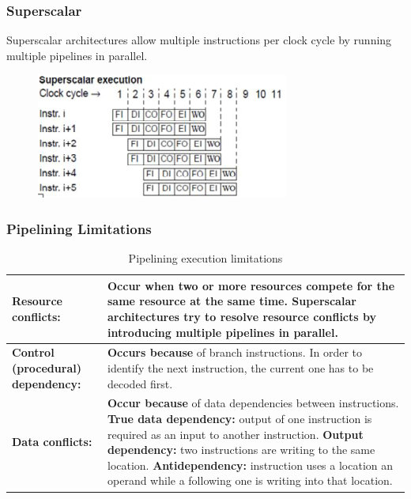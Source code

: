 		\begin{minipage}[t][7cm]{0.475\textwidth}
			\subsubsection{Superscalar}
			Superscalar architectures allow multiple instructions per clock cycle by running multiple pipelines in parallel.
			\vfill
			\begin{figure}[H]\centering
				\includegraphics[width=\textwidth]{./pictures/superscalar.png}
			\end{figure}
		\end{minipage}		
		
		
		\subsubsection{Pipelining Limitations}
			\begin{table}[H]\centering
				\begin{tabular}{|>{\bfseries}p{}|p{}|}
					\hline
					Resource conflicts:
						& \textbf{Occur when} two or more resources compete for the same resource at the same time. Superscalar architectures try to resolve resource conflicts by introducing multiple pipelines in parallel.\\
					\hline
					Control (procedural) dependency:
						& \textbf{Occurs because} of branch instructions. In order to identify the next instruction, the current one has to be decoded first.\\
					\hline
					Data conflicts:
						& \textbf{Occur because} of data dependencies between instructions.\newline
							\textbf{True data dependency:} output of one instruction is required as an input to another instruction.\newline
							\textbf{Output dependency:} two instructions are writing to the same location.\newline
							\textbf{Antidependency:} instruction uses a location an operand while a following one is writing into that location.\\
					\hline
				\end{tabular}
				\caption{Pipelining execution limitations}
				\label{tab:pipeliningLimitations}
			\end{table}
			
